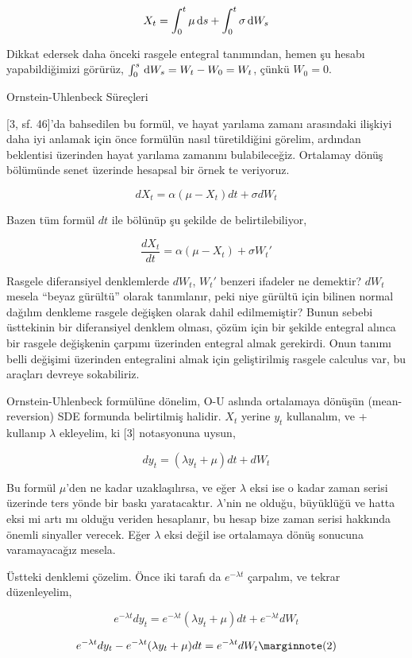 \documentclass[12pt,fleqn]{article}\usepackage{../../common}
\begin{document}
$$ X_t = \int _{0}^{t}\mu \,\mathrm{d} s + \int _{ 0}^{t} \sigma \,\mathrm{d} W_s $$

Dikkat edersek daha önceki rasgele entegral tanımından, hemen şu hesabı
yapabildiğimizi görürüz, $\int _{0}^{s} \,\mathrm{d} W_s = W_t - W_0 = W_t$, çünkü
$W_0=0$. 

Ornstein-Uhlenbeck Süreçleri

[3, sf. 46]'da bahsedilen bu formül, ve hayat yarılama zamanı arasındaki
ilişkiyi daha iyi anlamak için önce formülün nasıl türetildiğini görelim,
ardından beklentisi üzerinden hayat yarılama zamanını bulabileceğiz. Ortalamay
dönüş bölümünde senet üzerinde hesapsal bir örnek te veriyoruz.

$$ dX_t = \alpha(\mu - X_t)dt + \sigma dW_t $$

Bazen tüm formül $dt$ ile bölünüp şu şekilde de belirtilebiliyor, 

$$ \frac{dX_t}{dt} = \alpha(\mu - X_t) + \sigma W_t' $$

Rasgele diferansiyel denklemlerde $dW_t$, $W_t'$ benzeri ifadeler ne demektir?
$dW_t$ mesela ``beyaz gürültü'' olarak tanımlanır, peki niye gürültü için
bilinen normal dağılım denkleme rasgele değişken olarak dahil edilmemiştir?
Bunun sebebi üsttekinin bir diferansiyel denklem olması, çözüm için bir şekilde
entegral alınca bir rasgele değişkenin çarpımı üzerinden entegral almak
gerekirdi. Onun tanımı belli değişimi üzerinden entegralini almak için
geliştirilmiş rasgele calculus var, bu araçları devreye sokabiliriz.

Ornstein-Uhlenbeck formülüne dönelim, O-U aslında ortalamaya dönüşün
(mean-reversion) SDE formunda belirtilmiş halidir. $X_t$ yerine $y_t$
kullanalım, ve + kullanıp $\lambda$ ekleyelim, ki [3] notasyonuna uysun,

$$ dy_t = (\lambda y_t + \mu)dt + dW_t  $$

Bu formül $\mu$'den ne kadar uzaklaşılırsa, ve eğer $\lambda$ eksi ise o kadar
zaman serisi üzerinde ters yönde bir baskı yaratacaktır. $\lambda$'nin ne
olduğu, büyüklüğü ve hatta eksi mi artı mı olduğu veriden hesaplanır, bu hesap
bize zaman serisi hakkında önemli sinyaller verecek. Eğer $\lambda$ eksi değil
ise ortalamaya dönüş sonucuna varamayacağız mesela.

Üstteki denklemi çözelim. Önce iki tarafı da $e^{-\lambda t}$ çarpalım, ve
tekrar düzenleyelim,

$$ e^{-\lambda t}dy_t = e^{-\lambda t}(\lambda y_t + \mu)dt + e^{-\lambda t} dW_t  $$

$$ e^{-\lambda t}dy_t - e^{-\lambda t}(\lambda y_t + \mu)dt =  e^{-\lambda t} dW_t 
\mlabel{2}
$$
\end{document}
